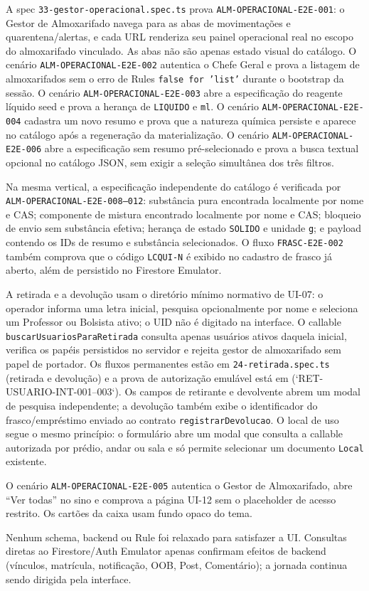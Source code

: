 A spec \texttt{33-gestor-operacional.spec.ts} prova
\texttt{ALM-OPERACIONAL-E2E-001}: o Gestor de Almoxarifado navega para as
abas de movimentações e quarentena/alertas, e cada URL renderiza seu painel
operacional real no escopo do almoxarifado vinculado. As abas não são apenas
estado visual do catálogo. O cenário \texttt{ALM-OPERACIONAL-E2E-002} autentica
o Chefe Geral e prova a listagem de almoxarifados sem o erro de Rules
\texttt{false for 'list'} durante o bootstrap da sessão. O cenário
\texttt{ALM-OPERACIONAL-E2E-003} abre a especificação do reagente líquido seed
e prova a herança de \texttt{LIQUIDO} e \texttt{ml}.
O cenário \texttt{ALM-OPERACIONAL-E2E-004} cadastra um novo resumo e prova
que a natureza química persiste e aparece no catálogo após a regeneração da
materialização.
O cenário \texttt{ALM-OPERACIONAL-E2E-006} abre a especificação sem resumo
pré-selecionado e prova a busca textual opcional no catálogo JSON, sem exigir
a seleção simultânea dos três filtros.

Na mesma vertical, a especificação independente do catálogo é verificada por
\texttt{ALM-OPERACIONAL-E2E-008--012}: substância pura encontrada localmente por
nome e CAS; componente de mistura encontrado localmente por nome e CAS; bloqueio
de envio sem substância efetiva; herança de estado \texttt{SOLIDO} e unidade
\texttt{g}; e payload contendo os IDs de resumo e substância selecionados. O
fluxo \texttt{FRASC-E2E-002} também comprova que o código \texttt{LCQUI-N} é
exibido no cadastro de frasco já aberto, além de persistido no Firestore
Emulator.

A retirada e a devolução usam o diretório mínimo normativo de UI-07: o operador
informa uma letra inicial, pesquisa opcionalmente por nome e seleciona um
Professor ou Bolsista ativo; o UID não é digitado na interface. O callable
\texttt{buscarUsuariosParaRetirada} consulta apenas usuários ativos daquela
inicial, verifica os papéis persistidos no servidor e rejeita gestor de
almoxarifado sem papel de portador. Os fluxos permanentes estão em
\texttt{24-retirada.spec.ts} (retirada e devolução) e a prova de autorização
emulável está em
(`RET-USUARIO-INT-001--003`).
Os campos de retirante e devolvente abrem um modal de pesquisa independente;
a devolução também exibe o identificador do frasco/empréstimo enviado ao
contrato \texttt{registrarDevolucao}.
O local de uso segue o mesmo princípio: o formulário abre um modal que
consulta a callable autorizada por prédio, andar ou sala e só permite
selecionar um documento \texttt{Local} existente.

O cenário \texttt{ALM-OPERACIONAL-E2E-005} autentica o Gestor de Almoxarifado,
abre ``Ver todas'' no sino e comprova a página UI-12 sem o placeholder de
acesso restrito. Os cartões da caixa usam fundo opaco do tema.

Nenhum schema, backend ou Rule foi relaxado para satisfazer a UI. Consultas
diretas ao Firestore/Auth Emulator apenas confirmam efeitos de backend
(vínculos, matrícula, notificação, OOB, Post, Comentário); a jornada continua
sendo dirigida pela interface.
